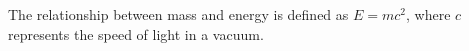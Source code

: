 \documentclass{article}
\begin{document}
The relationship between mass and energy is defined as $E = mc^2$, where $c$ represents the speed of light in a vacuum.
\end{document}
